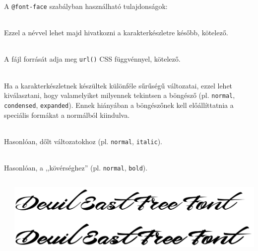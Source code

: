 \begin{frame}
  A \texttt{@font-face} szabályban használható tulajdonságok:
  \begin{description}[m]
    \item[\texttt{font-family}] \hfill \\ Ezzel a névvel lehet majd hivatkozni a karakterkészletre később, kötelező.
    \item[\texttt{src}] \hfill \\ A fájl forrását adja meg \texttt{url()} CSS függvénnyel, kötelező.
    \item[\texttt{font-stretch}] \hfill \\ Ha a karakterkészletnek készültek különféle sűrűségű változatai, ezzel lehet kiválasztani, hogy valamelyiket milyennek tekintsen a böngésző (pl. \texttt{normal}, \texttt{condensed}, \texttt{expanded}). Ennek hiányában a böngészőnek kell előállíttatnia a speciális formákat a normálból kiindulva.
    \item[\texttt{font-style}] \hfill \\ Hasonlóan, dőlt változatokhoz (pl. \texttt{normal}, \texttt{italic}).
    \item[\texttt{font-weight}] \hfill \\ Hasonlóan, a ,,kövérséghez'' (pl. \texttt{normal}, \texttt{bold}).
  \end{description}
\end{frame}

\begin{frame}
  \begin{columns}[c]
      \begin{exampleblock}{}
        \fontsize{7}{8} \selectfont
        
        
      \end{exampleblock}
      \includegraphics[width=\textwidth]{webfont.png}
  \end{columns}
\end{frame}

